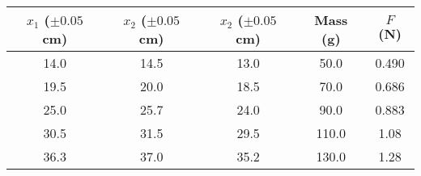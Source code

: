 \begin{tabular}{ccccc}
\toprule
 $x_1$ ($\pm0.05$ cm) &  $x_2$ ($\pm0.05$ cm) &  $x_2$ ($\pm0.05$ cm) &  Mass (g) &  $F$ (N) \\
\midrule
                           14.0 &                            14.5 &                            13.0 &      50.0 &      0.490 \\
                           19.5 &                            20.0 &                            18.5 &      70.0 &      0.686 \\
                           25.0 &                            25.7 &                            24.0 &      90.0 &      0.883 \\
                           30.5 &                            31.5 &                            29.5 &     110.0 &      1.08 \\
                           36.3 &                            37.0 &                            35.2 &     130.0 &      1.28 \\
\bottomrule
\end{tabular}
